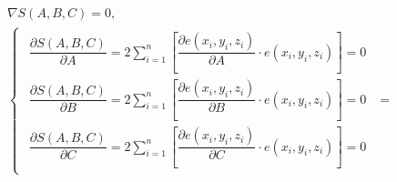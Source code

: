 \begin{gather*}
    \nabla S(A, B, C) = 0, \\
    \begin{cases}
        \begin{aligned}
            \dfrac{\partial S(A, B, C)}{\partial A} = 2 \sum_{i=1}^{n} \left[
            \dfrac{\partial e(x_i, y_i, z_i)}{\partial A} \cdot e(x_i, y_i, z_i) \right] = 0 \\
            \dfrac{\partial S(A, B, C)}{\partial B} = 2 \sum_{i=1}^{n} \left[
            \dfrac{\partial e(x_i, y_i, z_i)}{\partial B} \cdot e(x_i, y_i, z_i) \right] = 0 \\
            \dfrac{\partial S(A, B, C)}{\partial C} = 2 \sum_{i=1}^{n} \left[
            \dfrac{\partial e(x_i, y_i, z_i)}{\partial C} \cdot e(x_i, y_i, z_i) \right] = 0
        \end{aligned}
    \end{cases} =
\end{gather*}
